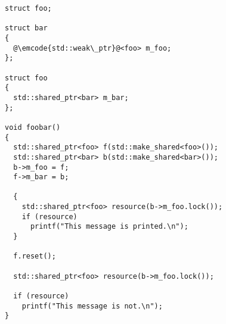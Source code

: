 \begin{lstlisting}
struct foo;

struct bar
{
  @\emcode{std::weak\_ptr}@<foo> m_foo;
};

struct foo
{
  std::shared_ptr<bar> m_bar;
};

void foobar()
{
  std::shared_ptr<foo> f(std::make_shared<foo>());
  std::shared_ptr<bar> b(std::make_shared<bar>());
  b->m_foo = f;
  f->m_bar = b;

  {
    std::shared_ptr<foo> resource(b->m_foo.lock());
    if (resource)
      printf("This message is printed.\n");
  }

  f.reset();

  std::shared_ptr<foo> resource(b->m_foo.lock());

  if (resource)
    printf("This message is not.\n");
}
\end{lstlisting}
